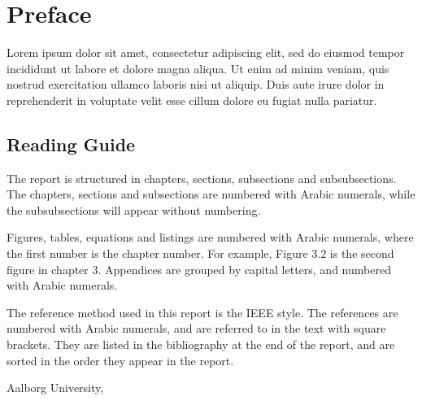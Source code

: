 \chapter*{Preface}\label{ch:preface}

Lorem ipsum dolor sit amet, consectetur adipiscing elit, sed do eiusmod tempor incididunt ut labore et dolore magna aliqua.
Ut enim ad minim veniam, quis nostrud exercitation ullamco laboris nisi ut aliquip. Duis aute irure dolor in reprehenderit in voluptate velit esse cillum dolore eu fugiat nulla pariatur.

\section*{Reading Guide}
The report is structured in chapters, sections, subsections and subsubsections.
The chapters, sections and subsections are numbered with Arabic numerals, while the subsubsections will appear without numbering.

Figures, tables, equations and listings are numbered with Arabic numerals, where the first number is the chapter number.
For example, Figure 3.2 is the second figure in chapter 3.
Appendices are grouped by capital letters, and numbered with Arabic numerals.

The reference method used in this report is the IEEE style.
The references are numbered with Arabic numerals, and are referred to in the text with square brackets.
They are listed in the bibliography at the end of the report, and are sorted in the order they appear in the report.


\vspace{\baselineskip}\hfill Aalborg University, %
\vfill\noindent
\newpage~\vfill %
